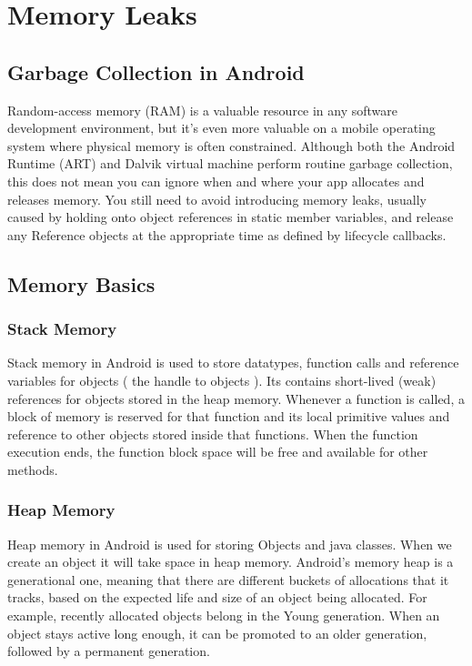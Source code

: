 
\chapter{Memory Leaks}


\section{Garbage Collection in Android}
Random-access memory (RAM) is a valuable resource in any software development environment, but it's even more valuable on a mobile operating system where physical memory is often constrained. Although both the Android Runtime (ART) and Dalvik virtual machine perform routine garbage collection, this does not mean you can ignore when and where your app allocates and releases memory. You still need to avoid introducing memory leaks, usually caused by holding onto object references in static member variables, and release any Reference objects at the appropriate time as defined by lifecycle callbacks.

\section{Memory Basics}
\subsection{Stack Memory}
Stack memory in Android is used to store datatypes, function calls and reference variables for objects ( the handle to objects ).
Its contains short-lived (weak) references for objects stored in the heap memory. Whenever a function is called, a block of memory is reserved for that function and its local primitive values and reference to other objects stored inside that functions. When the function execution ends, the function block space will be free and available for other methods.

\subsection{Heap Memory}
Heap memory  in Android is used for storing Objects and java classes. When we  create an object it will take space in heap memory. Android’s memory heap is a generational one, meaning that there are different buckets of allocations that it tracks, based on the expected life and size of an object being allocated. For example, recently allocated objects belong in the Young generation. When an object stays active long enough, it can be promoted to an older generation, followed by a permanent generation.

